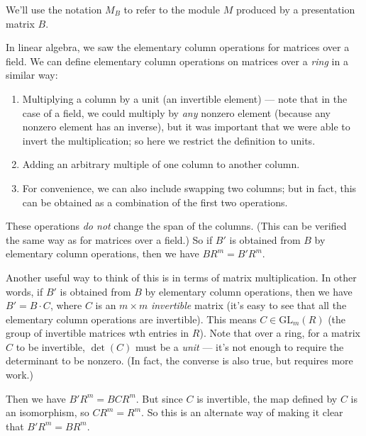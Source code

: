 We'll use the notation $M_B$ to refer to the module $M$ produced by a presentation matrix $B$. 

In linear algebra, we saw the elementary column operations for matrices over a field. We can define elementary column operations on matrices over a \emph{ring} in a similar way:
\begin{enumerate}
    \item Multiplying a column by a unit (an invertible element) --- note that in the case of a field, we could multiply by \emph{any} nonzero element (because any nonzero element has an inverse), but it was important that we were able to invert the multiplication; so here we restrict the definition to units. 
    \item Adding an arbitrary multiple of one column to another column. 
    \item For convenience, we can also include swapping two columns; but in fact, this can be obtained as a combination of the first two operations. 
\end{enumerate}

These operations \emph{do not} change the span of the columns. (This can be verified the same way as for matrices over a field.) So if $B'$ is obtained from $B$ by elementary column operations, then we have $BR^m = B'R^m$. 

Another useful way to think of this is in terms of matrix multiplication. In other words, if $B'$ is obtained from $B$ by elementary column operations, then we have $B' = B\cdot C$, where $C$ is an $m \times m$ \emph{invertible} matrix (it's easy to see that all the elementary column operations are invertible). This means $C \in \mathrm{GL}_m(R)$ (the group of invertible matrices wth entries in $R$). Note that over a ring, for a matrix $C$ to be invertible, $\det(C)$ must be a \emph{unit} --- it's not enough to require the determinant to be nonzero. (In fact, the converse is also true, but requires more work.)

Then we have $B'R^m = BCR^m$. But since $C$ is invertible, the map defined by $C$ is an isomorphism, so $CR^m = R^m$. So this is an alternate way of making it clear that $B'R^m = BR^m$. 


